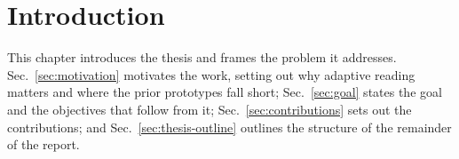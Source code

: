 \chapter{Introduction}
\label{ch:introduction}

This chapter introduces the thesis and frames the problem it addresses.
Sec.~\ref{sec:motivation} motivates the work, setting out why adaptive reading matters and where the prior prototypes fall short; Sec.~\ref{sec:goal} states the goal and the objectives that follow from it; Sec.~\ref{sec:contributions} sets out the contributions; and Sec.~\ref{sec:thesis-outline} outlines the structure of the remainder of the report.





